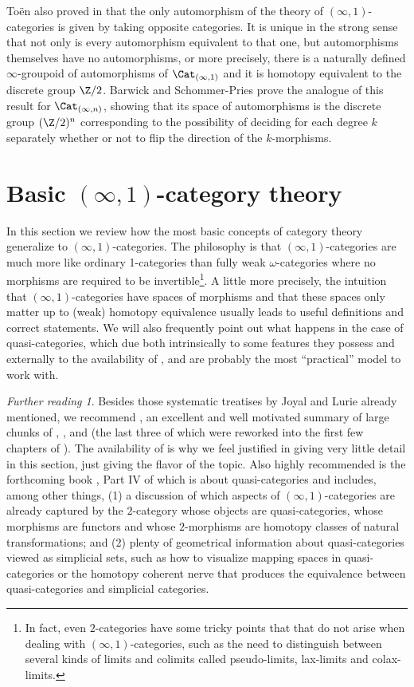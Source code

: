 \documentclass[12pt]{amsart}
\theoremstyle{definition} \newtheorem{definition}[theorem]{Definition}
\theoremstyle{remark} \newtheorem{remark}[theorem]{Remark}
\newtheorem*{further}{Further reading}
\numberwithin{equation}{section}
\newcommand{\oo}{\infty}
\newcommand{\io}{$(\oo,1)$}
\newcommand{\Catio}{\Cat_{(\oo,1)}}
\newcommand{\Catin}{\Cat_{(\oo,n)}}
\begin{document}
To\"{e}n also proved in \cite{ToenAx} that the only automorphism of
the theory of \io-categories is given by taking opposite categories.
It is unique in the strong sense that not only is every automorphism
equivalent to that one, but automorphisms themselves have no
automorphisms, or more precisely, there is a naturally defined
$\oo$-groupoid of automorphisms of $\Catio$ and it is homotopy
equivalent to the discrete group $\Z/2$. Barwick and Schommer-Pries
prove the analogue of this result for $\Catin$, showing that its
space of automorphisms is the discrete group $(\Z/2)^n$ corresponding
to the possibility of deciding for each degree $k$ separately whether
or not to flip the direction of the $k$-morphisms.

\section{Basic \io-category theory}

In this section we review how the most basic concepts of category
theory generalize to \io-categories. The philosophy is that
\io-categories are much more like ordinary 1-categories than fully
weak $\omega$-categories where no morphisms are required to be
invertible\footnote{In fact, even $2$-categories have some tricky
  points that that do not arise when dealing with \io-categories, such
  as the need to distinguish between several kinds of limits and
  colimits called pseudo-limits, lax-limits and colax-limits.}. A
little more precisely, the intuition that \io-categories have
spaces of morphisms and that these spaces only matter up to (weak)
homotopy equivalence usually leads to useful definitions and
correct statements. We will also frequently point out what happens in
the case of quasi-categories, which due both intrinsically to some
features they possess and externally to the availability of
\cite{Joyal}, \cite{HTT} and \cite{HA} are probably the most
``practical'' model to work with.

\begin{further} Besides those systematic treatises by Joyal and Lurie
already mentioned, we recommend \cite{Groth}, an excellent and well
motivated summary of large chunks of \cite{HTT}, \cite{DAG1},
\cite{DAG2} and \cite{DAG3} (the last three of which were reworked
into the first few chapters of \cite{HA}). The availability of
\cite{Groth} is why we feel justified in giving very little detail in
this section, just giving the flavor of the topic. Also highly
recommended is the forthcoming book \cite{Riehl}, Part IV of which is
about quasi-categories and includes, among other things, (1) a
discussion of which aspects of \io-categories are already captured by
the $2$-category whose objects are quasi-categories, whose morphisms
are functors and whose $2$-morphisms are homotopy classes of natural
transformations; and (2) plenty of geometrical information about
quasi-categories viewed as simplicial sets, such as how to visualize
mapping spaces in quasi-categories or the homotopy coherent nerve that
produces the equivalence between quasi-categories and simplicial
categories. \end{further}
\end{document}
